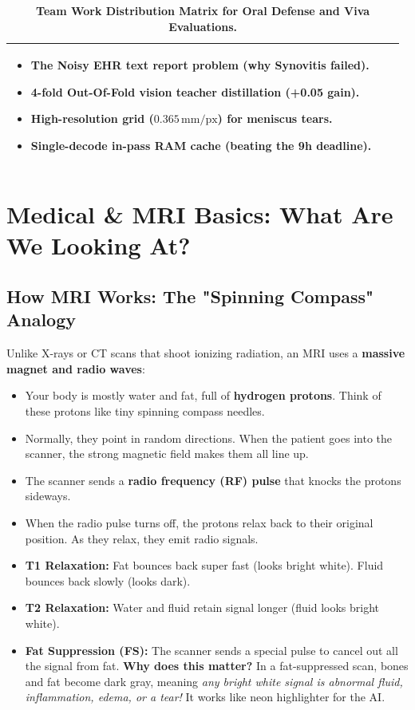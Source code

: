 \documentclass[11pt,a4paper]{article}
\begin{document}
\begin{table}[h!]
\begin{tabularx}{\textwidth}{p{3.5cm} p{4.1cm} X}
\begin{itemize}[leftmargin=*,noitemsep,topsep=0pt]
    \item The Noisy EHR text report problem (why Synovitis failed).
    \item 4-fold Out-Of-Fold vision teacher distillation (+0.05 gain).
    \item High-resolution grid ($0.365\,\text{mm/px}$) for meniscus tears.
    \item Single-decode in-pass RAM cache (beating the 9h deadline).
\end{itemize} \\
\bottomrule
\end{tabularx}
\caption{\textbf{Team Work Distribution Matrix for Oral Defense and Viva Evaluations.}}
\end{table}

\newpage

\section{Medical \& MRI Basics: What Are We Looking At?}

\subsection{How MRI Works: The "Spinning Compass" Analogy}
Unlike X-rays or CT scans that shoot ionizing radiation, an MRI uses a \textbf{massive magnet and radio waves}:
\begin{itemize}[leftmargin=*]
    \item Your body is mostly water and fat, full of \textbf{hydrogen protons}. Think of these protons like tiny spinning compass needles.
    \item Normally, they point in random directions. When the patient goes into the scanner, the strong magnetic field makes them all line up.
    \item The scanner sends a \textbf{radio frequency (RF) pulse} that knocks the protons sideways.
    \item When the radio pulse turns off, the protons relax back to their original position. As they relax, they emit radio signals.
    \item \textbf{T1 Relaxation:} Fat bounces back super fast (looks bright white). Fluid bounces back slowly (looks dark).
    \item \textbf{T2 Relaxation:} Water and fluid retain signal longer (fluid looks bright white).
    \item \textbf{Fat Suppression (FS):} The scanner sends a special pulse to cancel out all the signal from fat. \textbf{Why does this matter?} In a fat-suppressed scan, bones and fat become dark gray, meaning \textit{any bright white signal is abnormal fluid, inflammation, edema, or a tear!} It works like neon highlighter for the AI.
\end{itemize}
\end{document}
